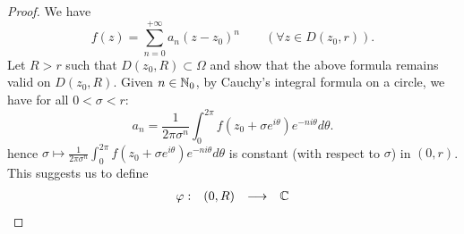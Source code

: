 \begin{proof}
We have
\[
f(z)  = 
\sum_{n=0}^{+\infty} a_n (z-z_0) ^n  \quad \quad (\forall  z \in   D(z_0, r) ) .
\]
Let $R > r$ such that $D(z_0, R) \subset \Omega$ and show that the above formula remains valid
on $D(z_0, R).$ Given $n \in  \mathbb{N}_0$, by Cauchy's integral formula on a circle, we have for all 
$0 <  \sigma  <  r:$ 
\[
a_n = \frac{1}{2\pi  \sigma ^n   }
\int_{0}^{2\pi } f(z_0 + \sigma  e^{i \theta}  ) e^{-n i \theta}d \theta.
\]
hence 
$\sigma \mapsto  \frac{1}{2\pi  \sigma ^n   } \int_{0}^{2\pi } f(z_0 + \sigma  e^{i \theta}  ) e^{-n i \theta}d \theta$ is
constant (with respect to $\sigma   $) in $(0, r)$. This suggests us to define 
\[
\begin{array}{cccl}
      \varphi : &  (0, R)  & \longrightarrow & \mathbb{C}  \\


\end{array}\]
\end{proof}
